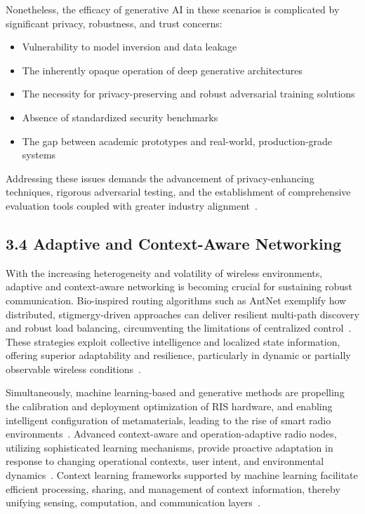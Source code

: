 \documentclass[11pt]{article}
\begin{document}
Nonetheless, the efficacy of generative AI in these scenarios is complicated by significant privacy, robustness, and trust concerns:
\begin{itemize}
    \item Vulnerability to model inversion and data leakage
    \item The inherently opaque operation of deep generative architectures
    \item The necessity for privacy-preserving and robust adversarial training solutions
    \item Absence of standardized security benchmarks
    \item The gap between academic prototypes and real-world, production-grade systems
\end{itemize}
Addressing these issues demands the advancement of privacy-enhancing techniques, rigorous adversarial testing, and the establishment of comprehensive evaluation tools coupled with greater industry alignment~\cite{ref46, ref49}.

\subsection{3.4 Adaptive and Context-Aware Networking}

With the increasing heterogeneity and volatility of wireless environments, adaptive and context-aware networking is becoming crucial for sustaining robust communication. Bio-inspired routing algorithms such as AntNet exemplify how distributed, stigmergy-driven approaches can deliver resilient multi-path discovery and robust load balancing, circumventing the limitations of centralized control~\cite{ref30}. These strategies exploit collective intelligence and localized state information, offering superior adaptability and resilience, particularly in dynamic or partially observable wireless conditions~\cite{ref30}.

Simultaneously, machine learning-based and generative methods are propelling the calibration and deployment optimization of RIS hardware, and enabling intelligent configuration of metamaterials, leading to the rise of smart radio environments~\cite{ref27, ref39}. Advanced context-aware and operation-adaptive radio nodes, utilizing sophisticated learning mechanisms, provide proactive adaptation in response to changing operational contexts, user intent, and environmental dynamics~\cite{ref28}. Context learning frameworks supported by machine learning facilitate efficient processing, sharing, and management of context information, thereby unifying sensing, computation, and communication layers~\cite{ref28, ref30}.
\end{document}
